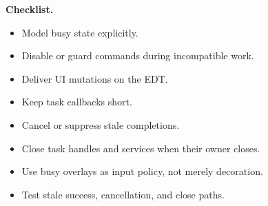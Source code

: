 \textbf{Checklist.}

\begin{itemize}
\item Model busy state explicitly.
\item Disable or guard commands during incompatible work.
\item Deliver UI mutations on the EDT.
\item Keep task callbacks short.
\item Cancel or suppress stale completions.
\item Close task handles and services when their owner closes.
\item Use busy overlays as input policy, not merely decoration.
\item Test stale success, cancellation, and close paths.
\end{itemize}
